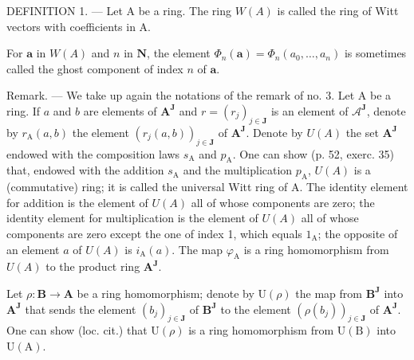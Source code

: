 DEFINITION 1. --- Let A be a ring. The ring \(W(A)\) is called the ring of Witt vectors with coefficients in A.

For \(\boldsymbol{a}\) in \(W(A)\) and \(n\) in \(\mathbf{N}\), the element \(\Phi_n(\boldsymbol{a}) = \Phi_n(a_0, \ldots, a_n)\) is sometimes called the ghost component of index \(n\) of \(\boldsymbol{a}\).

Remark. --- We take up again the notations of the remark of no. 3. Let A be a ring. If \(a\) and \(b\) are elements of \(\mathbf{A}^{\mathbf{J}}\) and \(r = (r_{j})_{j\in\mathbf{J}}\) is an element of \(\mathcal{A}^{\mathbf{J}}\), denote by \(r_{\mathrm{A}}(a,b)\) the element \((r_{j}(a,b))_{j\in\mathbf{J}}\) of \(\mathbf{A}^{\mathbf{J}}\). Denote by \(U(A)\) the set \(\mathbf{A}^{\mathbf{J}}\) endowed with the composition laws \(s_{\mathrm{A}}\) and \(p_{\mathrm{A}}\). One can show (p. 52, exerc. 35) that, endowed with the addition \(s_{\mathrm{A}}\) and the multiplication \(p_{\mathrm{A}}\), \(U(A)\) is a (commutative) ring; it is called the universal Witt ring of A. The identity element for addition is the element of \(U(A)\) all of whose components are zero; the identity element for multiplication is the element of \(U(A)\) all of whose components are zero except the one of index 1, which equals \(1_{\mathrm{A}}\); the opposite of an element \(a\) of \(U(A)\) is \(i_{\mathrm{A}}(a)\). The map \(\varphi_{\mathrm{A}}\) is a ring homomorphism from \(U(A)\) to the product ring \(\mathbf{A}^{\mathbf{J}}\).

Let \(\rho: \mathbf{B} \to \mathbf{A}\) be a ring homomorphism; denote by \(\mathrm{U}(\rho)\) the map from \(\mathbf{B}^{\mathbf{J}}\) into \(\mathbf{A}^{\mathbf{J}}\) that sends the element \((b_j)_{j \in \mathbf{J}}\) of \(\mathbf{B}^{\mathbf{J}}\) to the element \((\rho(b_j))_{j \in \mathbf{J}}\) of \(\mathbf{A}^{\mathbf{J}}\). One can show (loc. cit.) that \(\mathrm{U}(\rho)\) is a ring homomorphism from \(\mathrm{U}(\mathrm{B})\) into \(\mathrm{U}(\mathrm{A})\).
